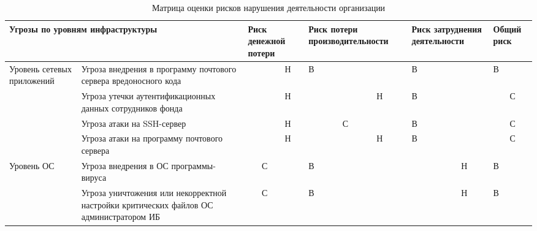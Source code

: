 \label{AppendixB}

\begin{sidewaystable}[h]
  \begin{longtable}{|p{2.7cm}|p{6cm}|p{0.7cm}|p{0.7cm}|p{0.7cm}|p{0.7cm}|p{0.7cm}|p{0.7cm}|p{0.7cm}|p{0.7cm}|p{0.7cm}|p{0.7cm}|p{0.7cm}|p{0.7cm}|}
    \caption{Матрица оценки рисков нарушения деятельности организации}
    \label{tab:matr_ocenki} \\
    \hline
    \multicolumn{2}{|p{8.7cm}|}{Угрозы по уровням инфраструктуры} &
    \multicolumn{3}{p{2.1cm}|}{Риск денежной потери} &
    \multicolumn{3}{p{2.1cm}|}{Риск потери производительности} &
    \multicolumn{3}{p{2.1cm}|}{Риск затруднения деятельности} &
    \multicolumn{3}{p{2.1cm}|}{Общий риск} \\\hline
    \multirow{4}{3cm}{Уровень сетевых прило\-жений} &
    Угроза внедрения в программу почтового сервера вредоносного кода
    &&&Н&В&&&В&&&В&&\\\cline{2-14}
    & Угроза утечки аутентификационных данных сотрудников фонда
    &&&Н&&&Н&В&&&&С&\\\cline{2-14}
    & Угроза атаки на SSH-сервер
    &&&Н&&С&&В&&&&С&\\\cline{2-14}
    & Угроза атаки на программу почтового сервера
    &&&Н&&&Н&В&&&&С&\\\hline
    \multirow{4}{3cm}{Уровень ОС} &
    Угроза внедрения в ОС программы-вируса
    &&С&&В&&&&&Н&В&&\\\cline{2-14}
    & Угроза уничтожения или некорректной настройки критических файлов
    ОС администратором ИБ
    &&С&&В&&&&&Н&В&&\\\hline
  \end{longtable}
\end{sidewaystable}

